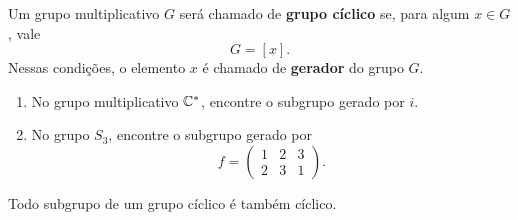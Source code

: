 \documentclass{beamer}
\begin{document}
    \begin{frame}
        \begin{definicao}
            Um grupo multiplicativo $G$ será chamado de \textbf{grupo cíclico} se, para algum $x \in G$, vale
            \[
                G = [x].
            \]
            Nessas condições, o elemento $x$ é chamado de \textbf{gerador} do grupo $G$.
        \end{definicao}
    \end{frame}

    \begin{frame}
        \begin{exemplos}
            \begin{enumerate}[label={\arabic*})]
                \item No grupo multiplicativo $\mathbb{C}^*$, encontre o subgrupo gerado por $i$.

                \item No grupo $S_3$, encontre o subgrupo gerado por
                \[
                    f = \begin{pmatrix}
                        1 & 2 & 3\\
                        2 & 3 & 1
                    \end{pmatrix}.
                \]
            \end{enumerate}
        \end{exemplos}
    \end{frame}

    \begin{frame}
        \begin{proposicao}
            Todo subgrupo de um grupo cíclico é também cíclico.
        \end{proposicao}
    \end{frame}
\end{document}
